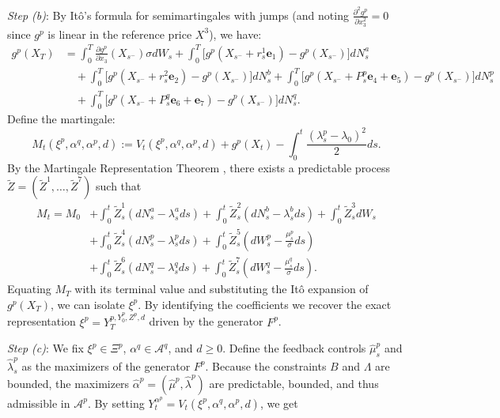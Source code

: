 \documentclass[12pt]{article}
\begin{document}
\textit{Step (b)}: By Itô's formula for semimartingales with jumps (and noting $\frac{\partial^2 g^p}{\partial x_3^2} = 0$ since $g^p$ is linear in the reference price $X^3$), we have:
\begin{align*}
    g^p(X_T) &= \int_0^T \frac{\partial g^p}{\partial x_3}(X_{s^-}) \sigma dW_s + \int_0^T \big[ g^p(X_{s^-} + r_s^1\mathbf{e}_1) - g^p(X_{s^-}) \big] dN^{a}_s \\
    &\quad + \int_0^T \big[ g^p(X_{s^-} + r_s^2\mathbf{e}_2) - g^p(X_{s^-}) \big] dN^{b}_s + \int_0^T \big[ g^p(X_{s^-} + P^p_s\mathbf{e}_4 + \mathbf{e}_5) - g^p(X_{s^-}) \big] dN^p_s \\
    &\quad + \int_0^T \big[ g^p(X_{s^-} + P^q_s\mathbf{e}_6 + \mathbf{e}_7) - g^p(X_{s^-}) \big] dN^{q}_s.
\end{align*}
Define the martingale:
\begin{equation}
    M_t(\xi^p,\alpha^{q}, \alpha^p,d) := V_t(\xi^p,\alpha^{q}, \alpha^p,d) + g^p(X_t) - \int_0^t \frac{(\lambda^p_s - \lambda_0 )^2}{2} ds.
    \label{eq:Mdef}
\end{equation}
By the Martingale Representation Theorem \cite[Lemma A.1]{euch2021optimal}, there exists a predictable process $\tilde{Z} = (\tilde{Z}^1, \dots, \tilde{Z}^7)$ such that \begin{align*}
    M_t = M_0 &+ \int_0^t \tilde{Z}^1_s (dN^a_s - \lambda^a_s ds) + \int_0^t \tilde{Z}^2_s (dN^b_s - \lambda^b_s ds) + \int_0^t \tilde{Z}^3_s dW_s \\
    &+ \int_0^t \tilde{Z}^4_s (dN^p_s - \lambda^p_s ds) + \int_0^t \tilde{Z}^5_s \left(dW^p_s - \frac{\mu^p_s}{\sigma} ds\right) \\
    &+ \int_0^t \tilde{Z}^6_s (dN^q_s - \lambda^q_s ds) + \int_0^t \tilde{Z}^7_s \left(dW^q_s - \frac{\mu^q_s}{\sigma} ds\right).
\end{align*} 
Equating $M_T$ with its terminal value and substituting the Itô expansion of $g^p(X_T)$, we can isolate $\xi^p$. By identifying the coefficients 
we recover the exact representation $\xi^p = Y_T^{p, Y_0^p, Z^p, d}$ driven by the generator $F^p$.

\textit{Step (c)}: We fix $\xi^p \in \Xi^p$, $\alpha^{q} \in \mathcal{A}^q$, and $d \geq 0$. Define the feedback controls $\hat{\mu}^p_s$ and $\hat{\lambda}^p_s$ as the maximizers of the generator $F^p$. Because the constraints $B$ and $\Lambda$ are bounded, the maximizers $\hat{\alpha}^p = (\hat{\mu}^p, \hat{\lambda}^p)$ are predictable, bounded, and thus admissible in $\mathcal{A}^p$. 
By setting $Y^{\alpha^p}_t = V_t(\xi^p, \alpha^{q}, \alpha^p, d)$, we get
\end{document}

